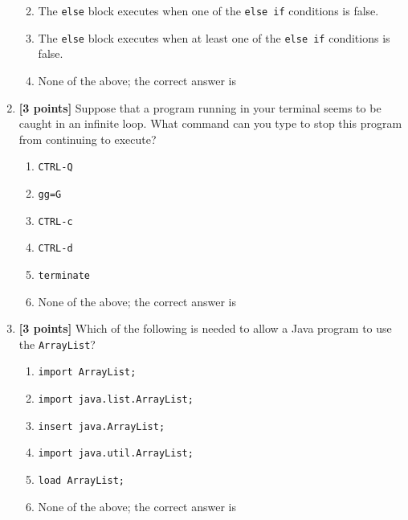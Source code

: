 \begin{enumerate}
\begin{enumerate}
\medskip 
\item The {\tt else} block executes when one of the {\tt else if} conditions is false.

\medskip 
\item The {\tt else} block executes when at least one of the {\tt else if} conditions is false.

\medskip
\item None of the above; the correct answer is \underline{\hspace{3in}}
\end{enumerate}


\bigskip
\bigskip
\bigskip
\bigskip

\item {\bf [3 points]}
  Suppose that a program running in your terminal seems to be caught in an infinite loop. What command can you
  type to stop this program from continuing to execute?
  \begin{enumerate}
    \item {\tt CTRL-Q}
      \medskip 
    \item {\tt gg=G}
      \medskip
    \item {\tt CTRL-c}
      \medskip 
    \item {\tt CTRL-d}
      \medskip
    \item {\tt terminate}
      \medskip
\item None of the above; the correct answer is \underline{\hspace{3in}}
  \end{enumerate}

\bigskip
\bigskip
\bigskip

\item {\bf [3 points]}
  Which of the following is needed to allow a Java program to use the {\tt ArrayList}?
  \begin{enumerate}
    \item {\tt import ArrayList;}
      \medskip 
    \item {\tt import java.list.ArrayList;}
      \medskip 
    \item {\tt insert java.ArrayList;}
      \medskip
    \item {\tt import java.util.ArrayList;}
      \medskip
    \item {\tt load ArrayList;}
      \medskip
    \item None of the above; the correct answer is \underline{\hspace{3in}}
  \end{enumerate}


\end{enumerate}
